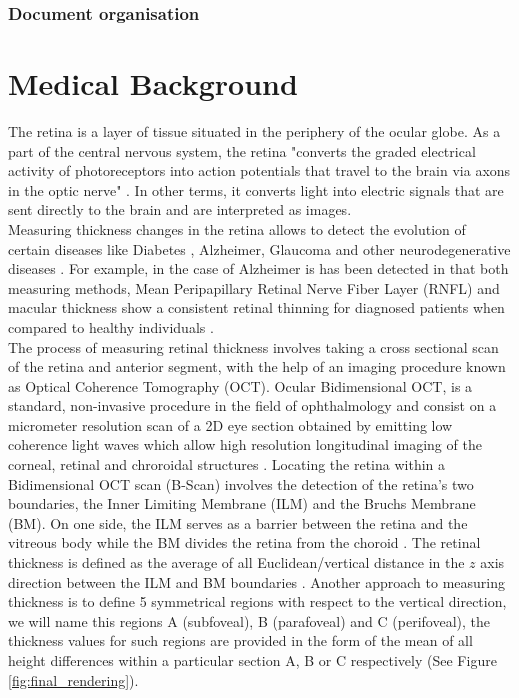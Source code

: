 \documentclass[12pt,a4paper]{scrartcl}
\begin{document}
\subsubsection{Document organisation}

\section{Medical Background}\label{s:medical_background}

The retina is a layer of tissue situated in the periphery of the ocular globe. As a part of the central nervous system, the retina "converts the graded electrical activity of photoreceptors into action potentials that travel to the brain via axons in the optic nerve" \cite{purves2001}. In other terms, it converts light into electric signals that are sent directly to the brain and are interpreted as images. \\

Measuring thickness changes in the retina allows to detect the evolution of certain diseases like Diabetes \cite{Jiang2018}, Alzheimer, Glaucoma and other neurodegenerative diseases \cite{DENHAAN2017162}. For example, in the case of Alzheimer is has been detected in \cite{DENHAAN2017162} that both measuring methods, Mean Peripapillary Retinal Nerve Fiber Layer (RNFL) and macular thickness show a consistent retinal thinning for diagnosed patients when compared to healthy individuals \cite{DENHAAN2017162}.\\

The process of measuring retinal thickness involves taking a cross sectional scan of the retina and anterior segment, with the help of an imaging procedure known as Optical Coherence Tomography (OCT). Ocular Bidimensional OCT, is a standard, non-invasive procedure in the field of ophthalmology and consist on a micrometer resolution scan of a 2D eye section obtained by emitting low coherence light waves which allow high resolution longitudinal imaging of the corneal, retinal and chroroidal structures \cite{Ronchetti2019statistic}. Locating the retina within a Bidimensional OCT scan (B-Scan) involves the detection of the retina's two boundaries, the Inner Limiting Membrane (ILM) and the Bruchs Membrane (BM). On one side, the ILM serves as a barrier between the retina and the vitreous body \cite{MACNAIR2015343} while the BM divides the retina from the choroid \cite{BOOIJ20101}. The retinal thickness is defined as the average of all Euclidean/vertical distance in the $z$ axis direction between the ILM and BM boundaries \cite{Ronchetti2019statistic}. Another approach to measuring thickness is to define 5 symmetrical regions with respect to the vertical direction, we will name this regions A (subfoveal), B (parafoveal) and C (perifoveal), the thickness values for such regions are provided in the form of the mean of all height differences within a particular section A, B or C respectively \cite{Ronchetti2019statistic} (See Figure \ref{fig:final_rendering}). 
\end{document}
